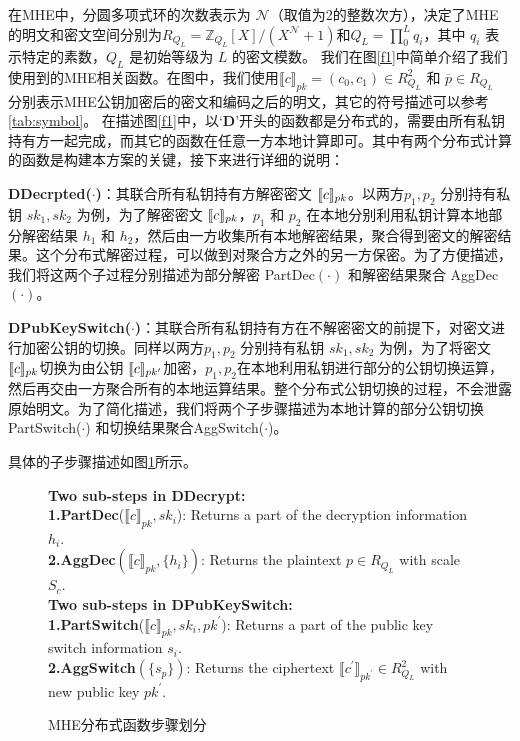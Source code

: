 在MHE中，分圆多项式环的次数表示为 $\mathcal{N}$（取值为2的整数次方），决定了MHE的明文和密文空间分别为$R_{Q_{L}}=\mathbb{Z}_{Q_{L}}[X]/(X^{\mathcal{N}}+1)$和$Q_{L}=\prod_{0}^{L}q_i$，其中 $q_i$ 表示特定的素数，$Q_L$ 是初始等级为 $L$ 的密文模数。
我们在图\ref{f1}中简单介绍了我们使用到的MHE相关函数。在图中，我们使用$\llbracket c\rrbracket_{pk}=(c_0,c_1)\in R^2_{Q_{L}}$ 和 $\overline{p}\in R_{Q_{L}}$ 分别表示MHE公钥加密后的密文和编码之后的明文，其它的符号描述可以参考\ref{tab:symbol}。
在描述图\ref{f1}中，以$‘\textbf{D}’$开头的函数都是分布式的，需要由所有私钥持有方一起完成，而其它的函数在任意一方本地计算即可。其中有两个分布式计算的函数是构建本方案的关键，接下来进行详细的说明：
\begin{compactitem}
	\item \textbf{DDecrpted($\cdot$)}：其联合所有私钥持有方解密密文 $\ctx[pk]{c}$。以两方$p_1, p_2$ 分别持有私钥 $sk_1, sk_2$ 为例，为了解密密文 $\ctx[pk]{c}$，$p_1$ 和 $p_2$ 在本地分别利用私钥计算本地部分解密结果 $ h_1 $ 和 $ h_2 $，然后由一方收集所有本地解密结果，聚合得到密文的解密结果。这个分布式解密过程，可以做到对聚合方之外的另一方保密。为了方便描述，我们将这两个子过程分别描述为部分解密 PartDec$(\cdot)$ 和解密结果聚合 AggDec$(\cdot)$。
	\item  \textbf{DPubKeySwitch($ \cdot $)}：其联合所有私钥持有方在不解密密文的前提下，对密文进行加密公钥的切换。同样以两方$p_1, p_2$ 分别持有私钥 $sk_1, sk_2$ 为例，为了将密文$ \ctx[pk]{c} $切换为由公钥 $ \ctx[pk^{\prime}]{c} $加密，$ p_1,p_2 $在本地利用私钥进行部分的公钥切换运算，然后再交由一方聚合所有的本地运算结果。整个分布式公钥切换的过程，不会泄露原始明文。为了简化描述，我们将两个子步骤描述为本地计算的部分公钥切换PartSwitch($\cdot$) 和切换结果聚合AggSwitch($\cdot$)。
\end{compactitem}
具体的子步骤描述如图\ref{f2}所示。
\begin{figure}
	\begin{framed}
		\textbf{Two sub-steps in DDecrypt:}\\
		\textbf{1.PartDec}($\llbracket c\rrbracket_{pk},sk_i$): Returns a part of the decryption information $h_i$.\\
		\textbf{2.AggDec}$(\llbracket c\rrbracket_{pk},\{h_i\})$: Returns the plaintext $p\in R_{Q_{L}}$ with scale $S_c$.\\
		
		\textbf{Two sub-steps in DPubKeySwitch:}\\
		\textbf{1.PartSwitch}($\llbracket c\rrbracket_{pk},{sk_i},pk^{\prime}$): Returns a part of the public key switch information $s_i$.\\
		\textbf{2.AggSwitch}$(\{s_p\})$: Returns the ciphertext $\llbracket c^{\prime}\rrbracket_{pk^{\prime}} \in R^2_{Q_{L}}$ with new public key $pk^{\prime}$.
	\end{framed}
	\caption{MHE分布式函数步骤划分}
	\label{f2}
\end{figure}




